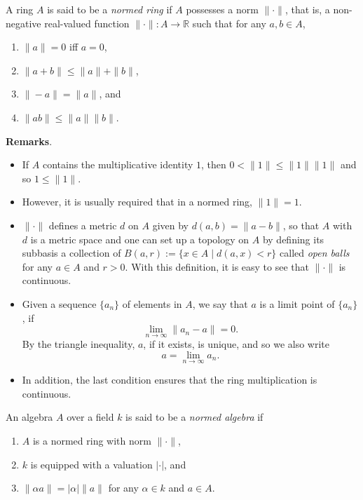 \documentclass[12pt]{article}
\begin{document}
A ring $A$ is said to be a \emph{normed ring} if $A$ possesses a norm $\| \cdot \|$, that is, a non-negative real-valued function $\|\cdot \|:A\to \mathbb{R}$ such that for any $a,b\in A$,
\begin{enumerate}
\item $\|a\|=0$ iff $a=0$,
\item $\|a+b\|\le \|a\|+\|b\|$, 
\item $\|-a\|=\|a\|$, and
\item $\|ab\|\le \|a\|\|b\|$.
\end{enumerate}

\textbf{Remarks}.  
\begin{itemize}
\item If $A$ contains the multiplicative identity $1$, then $0<\|1\| \le\|1\|\|1\|$ and so $1\le \|1\|$.  
\item However, it is usually required that in a normed ring, $\|1\|=1$.
\item $\|\cdot\|$ defines a metric $d$ on $A$ given by $d(a,b)=\|a-b\|$, so that $A$ with $d$ is a metric space and one can set up a topology on $A$ by defining its subbasis a collection of $B(a,r):=\lbrace x\in A\mid d(a,x)< r\rbrace$ called \emph{open balls} for any $a\in A$ and $r>0$.  With this definition, it is easy to see that $\|\cdot\|$ is continuous.
\item Given a sequence $\lbrace a_n\rbrace$ of elements in $A$, we say that $a$ is a limit point of $\lbrace a_n\rbrace$, if $$\lim_{n\to\infty}\|a_n-a\|=0.$$  By the triangle inequality, $a$, if it exists, is unique, and so we also write $$a=\lim_{n\to\infty}a_n.$$
\item In addition, the last condition ensures that the ring multiplication is continuous.
\end{itemize}

An algebra $A$ over a field $k$ is said to be a \emph{normed algebra} if 
\begin{enumerate}
\item $A$ is a normed ring with norm $\|\cdot\|$,
\item $k$ is equipped with a valuation $| \cdot |$, and
\item $\|\alpha a\|=|\alpha|\|a\|$ for any $\alpha \in k$ and $a\in A$.
\end{enumerate}
\end{document}
